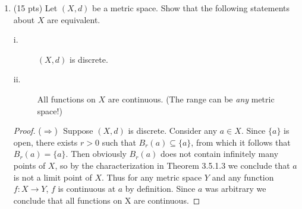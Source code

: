 \documentclass[12pt,twoside]{article}
\newcommand{\forward}{\noindent ($\Longrightarrow$) \,\,}
\newcommand{\R}{\mathbb R} %
\newcommand{\N}{\mathbb N} %
\begin{document}
\begin{enumerate}
\begin{itemize}
\begin{proof} We need to be quite careful indeed; the problem is actually stated quite ambiguously because it is not clear over which domain we are to consider this function. I think it is safe to assume that we are considering a function $f:\R^*\to \R$ defined by $f(x)=\cos\frac{1}{x}$, where $0\in\R$ is a limit point of the subset $\R^*$. To show $\lim_{x\to 0} f(x)$ does not exist, we will show that it is not equal to any candidate $L\in\R$. First consider $L=0$ and pick $\epsilon=\frac{1}{2}.$ Let $\delta>0$ and choose $n\in\N$ such that $n>\frac{1}{\delta}.$ Then $$0 < \Big|\frac{1}{2n\pi}-0\Big| <\frac{1}{n} < \delta,$$ yet
$$\left| f\left( \frac{1}{2n\pi}\right) - L \right| = \big| \cos(2n\pi) - 0 \big| = |1-0|
															= 1
															 > \epsilon.$$
This shows that $\lim_{x\to 0}f(x) \ne 0$. Now consider any $L\ne 0$, and pick $\epsilon=|L|.$ As before, for any $\delta>0$ choose $n\in\N$ such that $n>\frac{1}{\delta}.$ Then
$$0 < \Big|\frac{1}{2n\pi+\frac{\pi}{2}}-0\Big| <\frac{1}{n} < \delta,$$ yet
$$\left| f\left( \frac{1}{2n\pi+\frac{\pi}{2}}\right) - L \right| = \left| \cos\left(2n\pi+\frac{\pi}{2}\right) - L \right| = |0-L|=|L|=\epsilon.$$ Therefore $\lim_{x\to 0} f(x) \ne L$. So in considering the cases when $L=0$ and $L\ne0$, we have shown that the limit of $f$ as $x$ goes to 0 is not $L$ for any $L$ in the codomain $\R$. Therefore the limit does not exist.\end{proof}

\end{itemize}


\item  (15 pts) Let $(X,d)$ be a metric space.  Show that the
following statements about $X$ are equivalent.

\begin{description}
\item[i.]  $(X,d)$ is discrete. \item[ii.]  All functions on $X$
are continuous.  (The range can be {\em any} metric space!)
\end{description}

\begin{proof} \forward Suppose $(X,d)$ is discrete. Consider any $a\in X$. Since $\{a\}$ is open, there exists $r>0$ such that $B_r(a)\subseteq\{a\}$, from which it follows that $B_r(a)=\{a\}$. Then obviously $B_r(a)$ does not contain infinitely many points of $X$, so by the characterization in Theorem 3.5.1.3 we conclude that $a$ is not a limit point of $X$. Thus for any metric space $Y$ and any function $f:X\to Y$, $f$ is continuous at $a$ by definition. Since $a$ was arbitrary we conclude that all functions on X are continuous.


\end{proof}
\end{enumerate}
\end{document}
